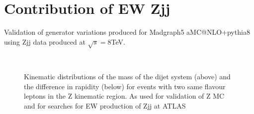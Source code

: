 \section{Contribution of EW Zjj}
\label{sec:miscZstudies}

\graphicspath{{figures/}}

Validation of generator variations produced for Madgraph5 aMC@NLO+pythia8 using Zjj data produced at $\sqrt{s}=8$TeV.

\begin{figure}[h!]
  \centering
  \\
  \caption{Kinematic distributions of the mass of the dijet system (above) and the difference in rapidity (below) for events with two same flavour leptons in the Z kinematic region. As used for validation of Z MC and for searches for EW production of Zjj at ATLAS}
    \label{fig:Zjj}
\end{figure}

